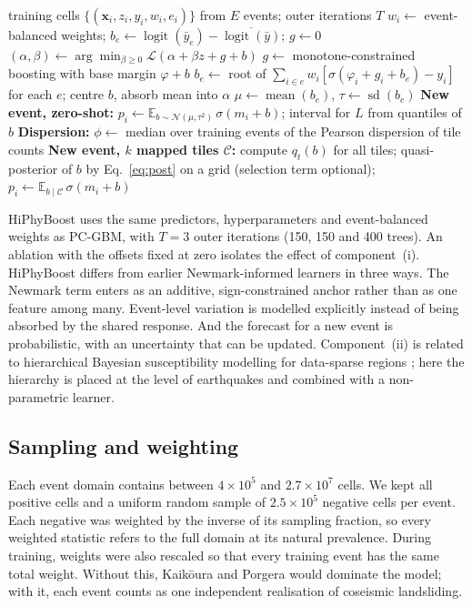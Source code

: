 \begin{algorithm*}[t]
\caption{HiPhyBoost: training, zero-shot transfer and overdispersion-aware updating}\label{alg:hiphy}
\begin{algorithmic}[1]
\Require training cells $\{(\mathbf{x}_i,z_i,y_i,w_i,e_i)\}$ from $E$ events; outer iterations $T$
\State $w_i \gets$ event-balanced weights; $b_e \gets \operatorname{logit}(\bar y_e)-\overline{\operatorname{logit}(\bar y)}$; $g\gets 0$
  \State $(\alpha,\beta)\gets \arg\min_{\beta\ge 0} \mathcal{L}(\alpha+\beta z + g + b)$ 
  \State $g\gets$ monotone-constrained boosting with base margin $\varphi + b$
  \State $b_e\gets$ root of $\sum_{i\in e} w_i[\sigma(\varphi_i+g_i+b_e)-y_i]$ for each $e$; centre $b$, absorb mean into $\alpha$
\EndFor
\State $\mu\gets \operatorname{mean}(b_e)$, $\tau\gets \operatorname{sd}(b_e)$ 
\Statex \textbf{New event, zero-shot:} $p_i\gets\mathbb{E}_{b\sim\mathcal{N}(\mu,\tau^2)}\,\sigma(m_i+b)$; interval for $L$ from quantiles of $b$
\Statex \textbf{Dispersion:} $\phi\gets$ median over training events of the Pearson dispersion of tile counts
\Statex \textbf{New event, $k$ mapped tiles $\mathcal{C}$:} compute $q_t(b)$ for all tiles; quasi-posterior of $b$ by Eq.~\eqref{eq:post} on a grid (selection term optional); $p_i\gets\mathbb{E}_{b\mid\mathcal{C}}\,\sigma(m_i+b)$
\end{algorithmic}
\end{algorithm*}

HiPhyBoost uses the same predictors, hyperparameters and event-balanced weights as PC-GBM, with $T=3$ outer iterations (150, 150 and 400 trees). An ablation with the offsets fixed at zero isolates the effect of component~(i). HiPhyBoost differs from earlier Newmark-informed learners \citep{zhang2025newmarkxgboost,liu2025newmarkcnn} in three ways. The Newmark term enters as an additive, sign-constrained anchor rather than as one feature among many. Event-level variation is modelled explicitly instead of being absorbed by the shared response. And the forecast for a new event is probabilistic, with an uncertainty that can be updated. Component~(ii) is related to hierarchical Bayesian susceptibility modelling for data-sparse regions \citep{wu2026hierarchical}; here the hierarchy is placed at the level of earthquakes and combined with a non-parametric learner.

\subsection{Sampling and weighting}
Each event domain contains between $4\times10^5$ and $2.7\times10^7$ cells. We kept all positive cells and a uniform random sample of $2.5\times10^5$ negative cells per event. Each negative was weighted by the inverse of its sampling fraction, so every weighted statistic refers to the full domain at its natural prevalence. During training, weights were also rescaled so that every training event has the same total weight. Without this, Kaik\={o}ura and Porgera would dominate the model; with it, each event counts as one independent realisation of coseismic landsliding.

